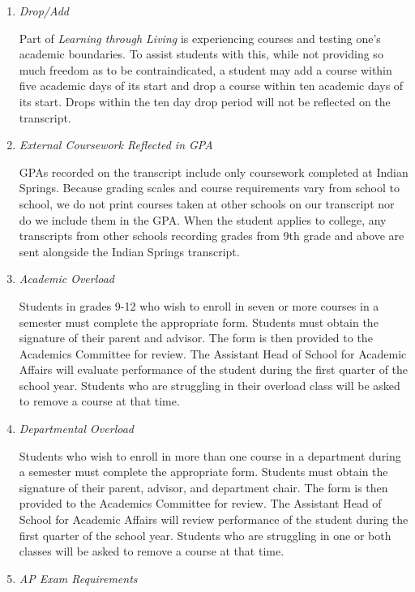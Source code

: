\begin{enumerate}
  
  \item \emph{Drop/Add}
  
  Part of \emph{Learning through Living} is experiencing courses and testing one's academic boundaries.  To assist students with this, while not providing so much freedom as to be contraindicated, a student may add a course within five academic days of its start and drop a course within ten academic days of its start.  Drops within the ten day drop period will not be reflected on the transcript.
  
  
  \item \emph{External Coursework Reflected in GPA} 
  
  GPAs recorded on the transcript include only coursework completed at Indian Springs.  Because grading scales and course requirements vary from school to school, we do not print courses taken at other schools on our transcript nor do we include them in the GPA.  When the student applies to college, any transcripts from other schools recording grades from 9th grade and above are sent alongside the Indian Springs transcript.

  \item \emph{Academic Overload }
  
  Students in grades 9-12 who wish to enroll in seven or more courses in a semester must complete the appropriate form. Students must obtain the signature of their parent and advisor.  The form is then provided to the Academics Committee for review. The Assistant Head of School for Academic Affairs will evaluate performance of the student during the first quarter of the school year. Students who are struggling in their overload class will be asked to remove a course at that time.
  
  \item \emph{Departmental Overload}
  
  Students who wish to enroll in more than one course in a department during a semester must complete the appropriate form.  Students must obtain the signature of their parent, advisor, and department chair.  The form is then provided to the Academics Committee for review.  The Assistant Head of School for Academic Affairs will review performance of the student during the first quarter of the school year. Students who are struggling in one or both classes will be asked to remove a course at that time.
  
  \item \emph{AP Exam Requirements}
  

\end{enumerate}
